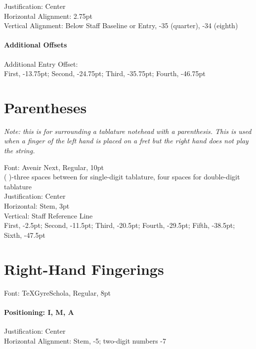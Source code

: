\documentclass[]{memoir}
\begin{document}
Justification: Center\\
Horizontal Alignment: 2.75pt\\
Vertical Alignment: Below Staff Baseline or Entry, -35 (quarter), -34 (eighth)\\

\paragraph{Additional Offsets}
\label{sec:additional-offsets}

Additional Entry Offset:\\
\indent First, -13.75pt; Second, -24.75pt; Third, -35.75pt; Fourth, -46.75pt

\section{Parentheses}
\label{sec:parentheses}

\emph{Note: this is for surrounding a tablature notehead with a parenthesis. This is used when a finger of the left hand is placed on a fret but the right hand does not play the string.}

Font: Avenir Next, Regular, 10pt\\
(   )-three spaces between for single-digit tablature, four spaces for double-digit tablature\\
Justification: Center\\
Horizontal: Stem, 3pt\\
Vertical: Staff Reference Line\\
\indent First, -2.5pt; Second, -11.5pt; Third, -20.5pt; Fourth, -29.5pt; Fifth, -38.5pt; Sixth, -47.5pt

\section{Right-Hand Fingerings}
\label{sec:right-hand-fing}

Font: TeXGyreSchola, Regular, 8pt\\

\paragraph{Positioning: I, M, A}
\label{sec:positioning:-i-m}

Justification: Center\\
Horizontal Alignment: Stem, -5; two-digit numbers -7\\
\end{document}
